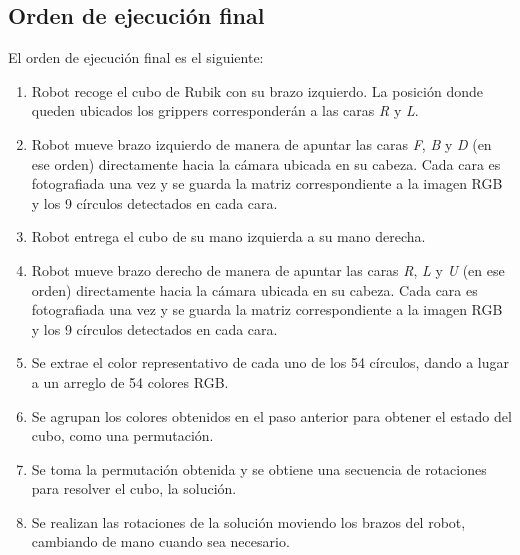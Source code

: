 \subsection{Orden de ejecución final}
El orden de ejecución final es el siguiente:
\begin{enumerate}
	\item Robot recoge el cubo de Rubik con su brazo izquierdo. La posición donde queden ubicados los grippers corresponderán a las caras \textit{R} y \textit{L}.
	\item Robot mueve brazo izquierdo de manera de apuntar las caras \textit{F}, \textit{B} y \textit{D} (en ese orden) directamente hacia la cámara ubicada en su cabeza. Cada cara es fotografiada una vez y se guarda la matriz correspondiente a la imagen RGB y los 9 círculos detectados en cada cara.
	\item Robot entrega el cubo de su mano izquierda a su mano derecha.
	\item Robot mueve brazo derecho de manera de apuntar las caras \textit{R}, \textit{L} y \textit{U} (en ese orden) directamente hacia la cámara ubicada en su cabeza. Cada cara es fotografiada una vez y se guarda la matriz correspondiente a la imagen RGB y los 9 círculos detectados en cada cara.
	\item Se extrae el color representativo de cada uno de los 54 círculos, dando a lugar a un arreglo de 54 colores RGB.
	\item Se agrupan los colores obtenidos en el paso anterior para obtener el estado del cubo, como una permutación.
	\item Se toma la permutación obtenida y se obtiene una secuencia de rotaciones para resolver el cubo, la solución.
	\item Se realizan las rotaciones de la solución moviendo los brazos del robot, cambiando de mano cuando sea necesario.
\end{enumerate}
